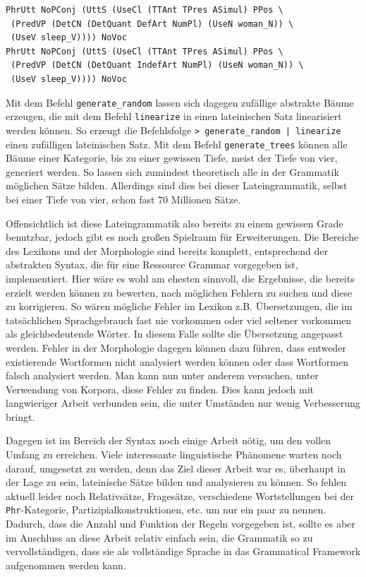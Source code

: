 \begin{lstlisting}[float=h!tp,caption={Abstrakte Syntaxrepräsentationen des Satzes \textit{feminae dormiunt}},label={GF-AbstractStrings},basicstyle=\small]
PhrUtt NoPConj (UttS (UseCl (TTAnt TPres ASimul) PPos \
 (PredVP (DetCN (DetQuant DefArt NumPl) (UseN woman_N)) \
 (UseV sleep_V)))) NoVoc 
PhrUtt NoPConj (UttS (UseCl (TTAnt TPres ASimul) PPos \ 
 (PredVP (DetCN (DetQuant IndefArt NumPl) (UseN woman_N)) \
 (UseV sleep_V)))) NoVoc
\end{lstlisting}
Mit dem Befehl \texttt{generate\_random} lassen sich dagegen zufällige abstrakte Bäume erzeugen, die mit dem Befehl \texttt{linearize} in einen lateinischen Satz linearisiert werden können. So erzeugt die Befehlsfolge \texttt{> generate\_random | linearize } einen zufälligen lateinischen Satz. Mit dem Befehl \texttt{generate\_trees} können alle Bäume einer Kategorie, bis zu einer gewissen Tiefe, meist der Tiefe von vier, generiert werden. So lassen sich zumindest theoretisch alle in der Grammatik möglichen Sätze bilden. Allerdings sind dies bei dieser Lateingrammatik, selbst bei einer Tiefe von vier, schon fast 70 Millionen Sätze. \par
Offensichtlich ist diese Lateingrammatik also bereits zu einem gewissen Grade benutzbar, jedoch gibt es noch großen Spielraum für Erweiterungen. Die Bereiche des Lexikons und der Morphologie sind bereits komplett, entsprechend der abstrakten Syntax, die für eine Ressource Grammar vorgegeben ist, implementiert. Hier wäre es wohl am ehesten sinnvoll, die Ergebnisse, die bereits erzielt werden können zu bewerten, nach möglichen Fehlern zu suchen und diese zu korrigieren. So wären mögliche Fehler im Lexikon z.B. Übersetzungen, die im tatsächlichen Sprachgebrauch fast nie vorkommen oder viel seltener vorkommen als gleichbedeutende Wörter. In diesem Falle sollte die Übersetzung angepasst werden. Fehler in der Morphologie dagegen können dazu führen, dass entweder existierende Wortformen nicht analysiert werden können oder dass Wortformen falsch analysiert werden. Man kann nun unter anderem versuchen, unter Verwendung von Korpora, diese Fehler zu finden. Dies kann jedoch mit langwieriger Arbeit verbunden sein, die unter Umständen nur wenig Verbesserung bringt. \par
Dagegen ist im Bereich der Syntax noch einige Arbeit nötig, um den vollen Umfang zu erreichen. Viele interessante linguistische Phänomene warten noch darauf, umgesetzt zu werden, denn das Ziel dieser Arbeit war es, überhaupt in der Lage zu sein, lateinische Sätze bilden und analysieren zu können. So fehlen aktuell leider noch Relativsätze, Fragesätze, verschiedene Wortstellungen bei der \texttt{Phr}-Kategorie, Partizipialkonstruktionen, etc. um nur ein paar zu nennen. Dadurch, dass die Anzahl und Funktion der Regeln vorgegeben ist, sollte es aber im Anschluss an diese Arbeit relativ einfach sein, die Grammatik so zu vervollständigen, dass sie als vollständige Sprache in das Grammatical Framework aufgenommen werden kann. 

